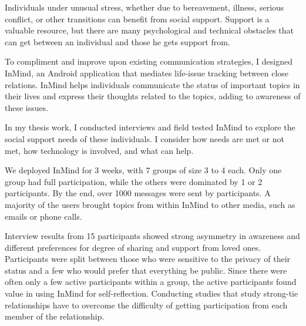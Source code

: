 %

Individuals under unusual stress, whether due to bereavement, illness,
serious conflict, or other transitions can benefit from social support.
Support is a valuable resource,
but there are many psychological and technical obstacles
that can get between an individual
and those he gets support from.

To compliment and improve upon existing communication strategies,
I designed InMind, an Android application
that mediates life-issue tracking
between close relations.
InMind helps individuals communicate
the status of important topics in their lives and 
express their thoughts related to the topics,
adding to awareness of these issues.

In my thesis work, I conducted interviews and field tested InMind
to explore the social support needs of
these individuals. I consider how needs are met or not met,
how technology is involved, and what can help.

We deployed InMind for 3 weeks, with 7 groups of size 3 to 4 each.
Only one group had full participation, 
while the others were dominated by 1 or 2 participants.
By the end, over 1000 messages were sent by participants.
A majority of the users brought topics from within InMind to other media,
such as emails or phone calls.

Interview results from 15 participants showed strong
asymmetry in awareness and different preferences for degree of sharing
and support from loved ones.
Participants were split between those who were sensitive to the privacy
of their status and a few who would prefer that everything be public.
Since there were often only a few active participants within a group,
the active participants found value in using InMind for self-reflection.
Conducting studies that study strong-tie relationships
have to overcome the difficulty of getting participation from each member
of the relationship.
